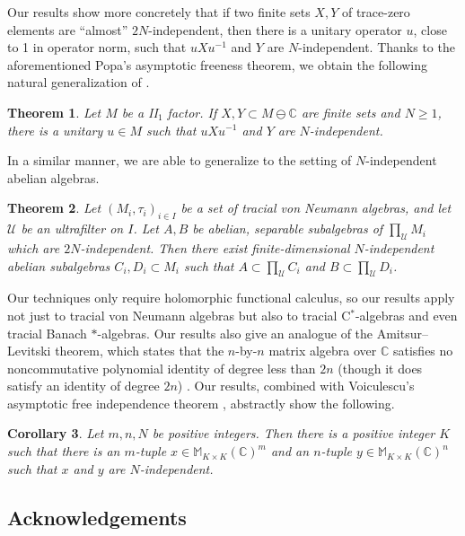 \documentclass[10pt]{amsart}
\numberwithin{equation}{section}
\newtheorem{main}{Theorem}
\newtheorem{mcor}[main]{Corollary}
\theoremstyle{definition}
\newcommand{\C}{\mathbb{C}}
\newcommand{\M}{\mathbb{M}}
\newcommand{\cU}{\mathcal{U}}
\begin{document}
Our results show more concretely that if two finite sets $X,Y$ of trace-zero elements are ``almost'' $2N$-independent, then there is a unitary operator $u$, close to 1 in operator norm, such that $uXu^{-1}$ and $Y$ are $N$-independent. Thanks to the aforementioned Popa's asymptotic freeness theorem, we obtain the following natural generalization of \cite[Theorem~H]{houdayer2023asymptotic}.

\begin{main}\label{mthm-perturb}
    Let $M$ be a II$_1$ factor. If $X,Y\subset M\ominus \C$ are finite sets and $N\ge1$, there is a unitary $u\in M$ such that $uXu^{-1}$ and $Y$ are $N$-independent.
\end{main}

In a similar manner, we are able to generalize \cite[Theorem~5.1]{houdayer2023asymptotic} to the setting of $N$-independent abelian algebras.

\begin{main}\label{mthm-lift-algs}
    Let $(M_i,\tau_i)_{i \in I}$ be a set of tracial von Neumann algebras, and let $\cU$ be an ultrafilter on $I$. Let $A,B$ be abelian, separable subalgebras of $\prod_\cU M_i$ which are $2N$-independent. Then there exist finite-dimensional $N$-independent abelian subalgebras $C_i,D_i\subset M_i$ such that $A\subset \prod_\cU C_i$ and $B\subset \prod_\cU D_i$. 
\end{main}


Our techniques only require holomorphic functional calculus, so our results apply not just to tracial von Neumann algebras but also to tracial C$^*$-algebras and even tracial Banach $*$-algebras. Our results also give an analogue of the Amitsur--Levitski theorem, which states that the $n$-by-$n$ matrix algebra over $\C$ satisfies no noncommutative polynomial identity of degree less than $2n$ (though it does satisfy an identity of degree $2n$) \cite{amitsur1950minimal}. Our results, combined with Voiculescu's asymptotic free independence theorem \cite{voiculescu1991limit}, abstractly show the following.

\begin{mcor}
    Let $m,n,N$ be positive integers. Then there is a positive integer $K$ such that there is an $m$-tuple $x \in \M_{K\times K}(\C)^m$ and an $n$-tuple $y \in \M_{K\times K}(\C)^n$ such that $x$ and $y$ are $N$-independent. 
\end{mcor}


\subsection*{Acknowledgements}
\end{document}
